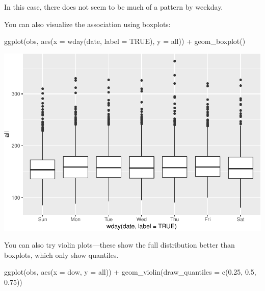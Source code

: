 \documentclass[
]{book}
\newenvironment{Shaded}{\begin{snugshade}}{\end{snugshade}}
\newcommand{\AttributeTok}[1]{\textcolor[rgb]{0.77,0.63,0.00}{#1}}
\newcommand{\ConstantTok}[1]{\textcolor[rgb]{0.00,0.00,0.00}{#1}}
\newcommand{\FloatTok}[1]{\textcolor[rgb]{0.00,0.00,0.81}{#1}}
\newcommand{\FunctionTok}[1]{\textcolor[rgb]{0.00,0.00,0.00}{#1}}
\newcommand{\NormalTok}[1]{#1}
\newcommand{\SpecialCharTok}[1]{\textcolor[rgb]{0.00,0.00,0.00}{#1}}
\begin{document}
In this case, there does not seem to be much of a pattern by weekday.

You can also visualize the association using boxplots:

\begin{Shaded}
\begin{Highlighting}[]
\FunctionTok{ggplot}\NormalTok{(obs, }\FunctionTok{aes}\NormalTok{(}\AttributeTok{x =} \FunctionTok{wday}\NormalTok{(date, }\AttributeTok{label =} \ConstantTok{TRUE}\NormalTok{), }\AttributeTok{y =}\NormalTok{ all)) }\SpecialCharTok{+} 
  \FunctionTok{geom\_boxplot}\NormalTok{()}
\end{Highlighting}
\end{Shaded}

\includegraphics{adv_epi_analysis_files/figure-latex/unnamed-chunk-20-1.pdf}

You can also try violin plots---these show the full distribution better than
boxplots, which only show quantiles.

\begin{Shaded}
\begin{Highlighting}[]
\FunctionTok{ggplot}\NormalTok{(obs, }\FunctionTok{aes}\NormalTok{(}\AttributeTok{x =}\NormalTok{ dow, }\AttributeTok{y =}\NormalTok{ all)) }\SpecialCharTok{+} 
  \FunctionTok{geom\_violin}\NormalTok{(}\AttributeTok{draw\_quantiles =} \FunctionTok{c}\NormalTok{(}\FloatTok{0.25}\NormalTok{, }\FloatTok{0.5}\NormalTok{, }\FloatTok{0.75}\NormalTok{))}
\end{Highlighting}
\end{Shaded}
\end{document}
